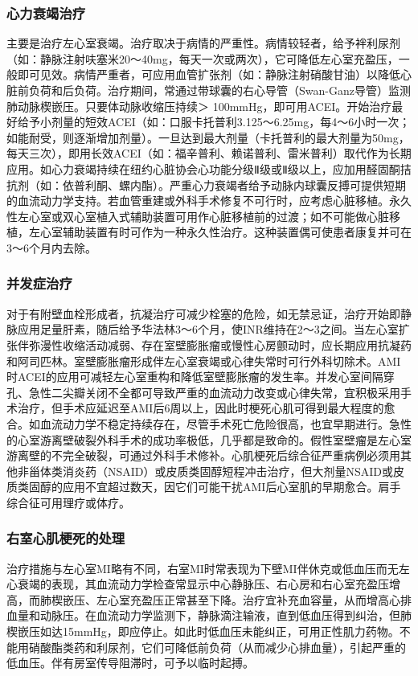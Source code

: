 \subsubsection{心力衰竭治疗}

主要是治疗左心室衰竭。治疗取决于病情的严重性。病情较轻者，给予袢利尿剂（如：静脉注射呋塞米20～40mg，每天一次或两次），它可降低左心室充盈压，一般即可见效。病情严重者，可应用血管扩张剂（如：静脉注射硝酸甘油）以降低心脏前负荷和后负荷。治疗期间，常通过带球囊的右心导管（Swan-Ganz导管）监测肺动脉楔嵌压。只要体动脉收缩压持续＞
100mmHg，即可用ACEI。开始治疗最好给予小剂量的短效ACEI（如：口服卡托普利3.125～6.25mg，每4～6小时一次；如能耐受，则逐渐增加剂量）。一旦达到最大剂量（卡托普利的最大剂量为50mg，每天三次），即用长效ACEI（如：福辛普利、赖诺普利、雷米普利）取代作为长期应用。如心力衰竭持续在纽约心脏协会心功能分级Ⅱ级或Ⅱ级以上，应加用醛固酮拮抗剂（如：依普利酮、螺内酯）。严重心力衰竭者给予动脉内球囊反搏可提供短期的血流动力学支持。若血管重建或外科手术修复不可行时，应考虑心脏移植。永久性左心室或双心室植入式辅助装置可用作心脏移植前的过渡；如不可能做心脏移植，左心室辅助装置有时可作为一种永久性治疗。这种装置偶可使患者康复并可在3～6个月内去除。

\subsubsection{并发症治疗}

对于有附壁血栓形成者，抗凝治疗可减少栓塞的危险，如无禁忌证，治疗开始即静脉应用足量肝素，随后给予华法林3～6个月，使INR维持在2～3之间。当左心室扩张伴弥漫性收缩活动减弱、存在室壁膨胀瘤或慢性心房颤动时，应长期应用抗凝药和阿司匹林。室壁膨胀瘤形成伴左心室衰竭或心律失常时可行外科切除术。AMI时ACEI的应用可减轻左心室重构和降低室壁膨胀瘤的发生率。并发心室间隔穿孔、急性二尖瓣关闭不全都可导致严重的血流动力改变或心律失常，宜积极采用手术治疗，但手术应延迟至AMI后6周以上，因此时梗死心肌可得到最大程度的愈合。如血流动力学不稳定持续存在，尽管手术死亡危险很高，也宜早期进行。急性的心室游离壁破裂外科手术的成功率极低，几乎都是致命的。假性室壁瘤是左心室游离壁的不完全破裂，可通过外科手术修补。心肌梗死后综合征严重病例必须用其他非甾体类消炎药（NSAID）或皮质类固醇短程冲击治疗，但大剂量NSAID或皮质类固醇的应用不宜超过数天，因它们可能干扰AMI后心室肌的早期愈合。肩手综合征可用理疗或体疗。

\subsubsection{右室心肌梗死的处理}

治疗措施与左心室MI略有不同，右室MI时常表现为下壁MI伴休克或低血压而无左心衰竭的表现，其血流动力学检查常显示中心静脉压、右心房和右心室充盈压增高，而肺楔嵌压、左心室充盈压正常甚至下降。治疗宜补充血容量，从而增高心排血量和动脉压。在血流动力学监测下，静脉滴注输液，直到低血压得到纠治，但肺楔嵌压如达15mmHg，即应停止。如此时低血压未能纠正，可用正性肌力药物。不能用硝酸酯类药和利尿剂，它们可降低前负荷（从而减少心排血量），引起严重的低血压。伴有房室传导阻滞时，可予以临时起搏。


